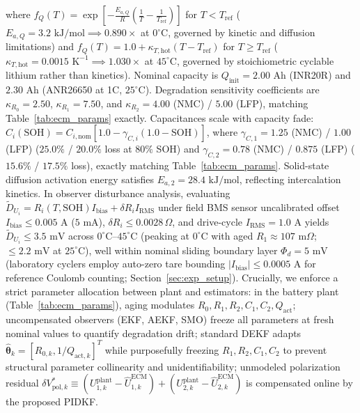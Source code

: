 \documentclass[balance,nocopyright,upint,varvw,hyphenate,barcolor=NavyBlue,nolists]{asmejour}
\begin{document}
where $f_Q(T) = \exp[-\frac{E_{a,Q}}{R}(\frac{1}{T} - \frac{1}{T_{\text{ref}}})]$ for $T < T_{\text{ref}}$ ($E_{a,Q} = 3.2\text{ kJ/mol} \implies 0.890\times$ at $0^\circ\text{C}$, governed by kinetic and diffusion limitations) and $f_Q(T) = 1.0 + \kappa_{T,\text{hot}}(T - T_{\text{ref}})$ for $T \ge T_{\text{ref}}$ ($\kappa_{T,\text{hot}} = 0.0015\text{ K}^{-1} \implies 1.030\times$ at $45^\circ\text{C}$, governed by stoichiometric cyclable lithium rather than kinetics). Nominal capacity is $Q_{\text{init}} = 2.00\text{ Ah}$ (INR20R) and $2.30\text{ Ah}$ (ANR26650 at 1C, $25^\circ\text{C}$). Degradation sensitivity coefficients are $\kappa_{R_0} = 2.50$, $\kappa_{R_1} = 7.50$, and $\kappa_{R_2} = 4.00$ (NMC) / $5.00$ (LFP), matching Table~\ref{tab:ecm_params} exactly. Capacitances scale with capacity fade: $C_i(\text{SOH}) = C_{i,\text{nom}} [1.0 - \gamma_{C,i} (1.0 - \text{SOH})]$, where $\gamma_{C,1} = 1.25$ (NMC) / $1.00$ (LFP) ($25.0\%$ / $20.0\%$ loss at $80\%$ SOH) and $\gamma_{C,2} = 0.78$ (NMC) / $0.875$ (LFP) ($15.6\%$ / $17.5\%$ loss), exactly matching Table~\ref{tab:ecm_params}. Solid-state diffusion activation energy satisfies $E_{a,2} = 28.4\text{ kJ/mol}$, reflecting intercalation kinetics. In observer disturbance analysis, evaluating $\tilde{D}_{U_i} = R_i(T,\text{SOH}) I_{\text{bias}} + \delta R_i I_{\text{RMS}}$ under field BMS sensor uncalibrated offset $I_{\text{bias}} \le 0.005\text{ A}$ ($5\text{ mA}$), $\delta R_i \le 0.0028\,\Omega$, and drive-cycle $I_{\text{RMS}} = 1.0\text{ A}$ yields $\tilde{D}_{U_i} \le 3.5\text{ mV}$ across $0^\circ\text{C}\text{--}45^\circ\text{C}$ (peaking at $0^\circ\text{C}$ with aged $R_1 \approx 107\text{ m}\Omega$; $\le 2.2\text{ mV}$ at $25^\circ\text{C}$), well within nominal sliding boundary layer $\Phi_d = 5\text{ mV}$ (laboratory cyclers employ auto-zero tare bounding $|I_{\text{bias}}| \le 0.0005\text{ A}$ for reference Coulomb counting; Section~\ref{sec:exp_setup}). Crucially, we enforce a strict parameter allocation between plant and estimators: in the battery plant (Table~\ref{tab:ecm_params}), aging modulates $R_0, R_1, R_2, C_1, C_2, Q_{\text{act}}$; uncompensated observers (EKF, AEKF, SMO) freeze all parameters at fresh nominal values to quantify degradation drift; standard DEKF adapts $\hat{\boldsymbol{\theta}}_k = [R_{0,k}, 1/Q_{\text{act},k}]^T$ while purposefully freezing $R_1, R_2, C_1, C_2$ to prevent structural parameter collinearity and unidentifiability; unmodeled polarization residual $\delta V_{\text{pol},k}^* \equiv (U_{1,k}^{\text{plant}} - \hat{U}_{1,k}^{\text{ECM}}) + (U_{2,k}^{\text{plant}} - \hat{U}_{2,k}^{\text{ECM}})$ is compensated online by the proposed PIDKF.
\end{document}
